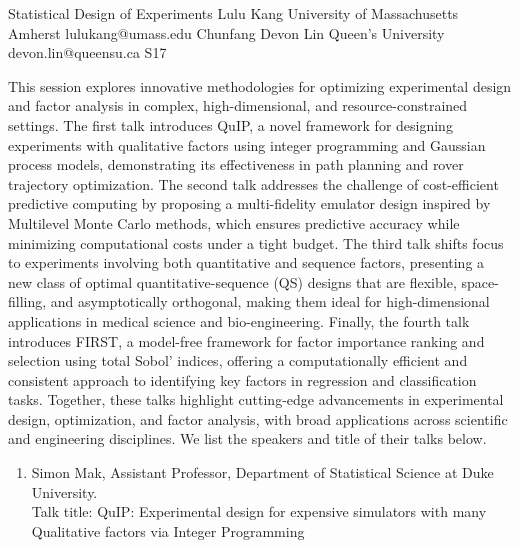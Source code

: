 

\clearpage

\begin{session}
 {Statistical Design of Experiments}%
 {Lulu Kang}%
 {University of Massachusetts Amherst}%
 {lulukang@umass.edu}%
 {Chunfang Devon Lin}%
 {Queen's University}%
 {devon.lin@queensu.ca}%
 {S17}%
{}

 \medskip
 This session explores innovative methodologies for optimizing experimental design and factor analysis in complex, high-dimensional, and resource-constrained settings. The first talk introduces QuIP, a novel framework for designing experiments with qualitative factors using integer programming and Gaussian process models, demonstrating its effectiveness in path planning and rover trajectory optimization. The second talk addresses the challenge of cost-efficient predictive computing by proposing a multi-fidelity emulator design inspired by Multilevel Monte Carlo methods, which ensures predictive accuracy while minimizing computational costs under a tight budget. The third talk shifts focus to experiments involving both quantitative and sequence factors, presenting a new class of optimal quantitative-sequence (QS) designs that are flexible, space-filling, and asymptotically orthogonal, making them ideal for high-dimensional applications in medical science and bio-engineering. Finally, the fourth talk introduces FIRST, a model-free framework for factor importance ranking and selection using total Sobol' indices, offering a computationally efficient and consistent approach to identifying key factors in regression and classification tasks. Together, these talks highlight cutting-edge advancements in experimental design, optimization, and factor analysis, with broad applications across scientific and engineering disciplines.
 We list the speakers and title of their talks below.
 \begin{enumerate}
 \item Simon Mak, Assistant Professor, Department of Statistical Science at Duke University. \\
 Talk title: QuIP: Experimental design for expensive simulators with many Qualitative factors via Integer Programming

\end{enumerate}
\end{session}
